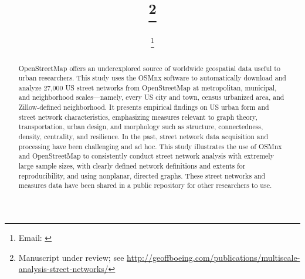 \documentclass[11pt]{article}
\begin{document}
	
\title{\papertitle\footnote{Manuscript under review; see \url{http://geoffboeing.com/publications/multiscale-analysis-street-networks/}}}
\date{\paperdate}
\author[]{\myname \thanks{Email: \href{mailto:\myemail}{\myemail}}}
\affil[]{\myaffiliation}

\maketitle

\begin{abstract}
OpenStreetMap offers an underexplored source of worldwide geospatial data useful to urban researchers. This study uses the OSMnx software to automatically download and analyze 27,000 US street networks from OpenStreetMap at metropolitan, municipal, and neighborhood scales---namely, every US city and town, census urbanized area, and Zillow-defined neighborhood. It presents empirical findings on US urban form and street network characteristics, emphasizing measures relevant to graph theory, transportation, urban design, and morphology such as structure, connectedness, density, centrality, and resilience. In the past, street network data acquisition and processing have been challenging and ad hoc. This study illustrates the use of OSMnx and OpenStreetMap to consistently conduct street network analysis with extremely large sample sizes, with clearly defined network definitions and extents for reproducibility, and using nonplanar, directed graphs. These street networks and measures data have been shared in a public repository for other researchers to use.
\end{abstract}

\vspace{0.25cm}
\end{document}
